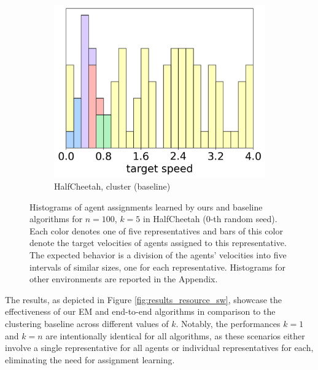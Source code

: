 \documentclass[letterpaper]{article} %
\begin{document}
\begin{figure}[t]
\begin{center}
\begin{subfigure}{0.3\textwidth}
    \end{subfigure}\hspace{10pt}%
    \begin{subfigure}{0.3\textwidth}
        \centering
        \caption{HalfCheetah, cluster (baseline)}
        \includegraphics[width=\linewidth]{pics/histograms/cluster/HalfCheetah.png}
    \end{subfigure}
\caption{Histograms of agent assignments learned by ours and baseline algorithms for $n=100$, $k=5$ in HalfCheetah ($0$-th random seed). Each color denotes one of five representatives and bars of this color denote the target velocities of agents assigned to this representative. The expected behavior is a division of the agents' velocities into five intervals of similar sizes, one for each representative. Histograms for other environments are reported in the Appendix.}
\label{fig:results_histograms}
\end{center}
\end{figure}



The results, as depicted in Figure \ref{fig:results_resource_sw}, showcase the effectiveness of our EM and end-to-end algorithms in comparison to the clustering baseline across different values of  $k$. Notably, the performances $k=1$ and $k=n$ are intentionally identical for all algorithms, as these scenarios either involve a single representative for all agents or individual representatives for each, eliminating the need for assignment learning.
\end{document}

